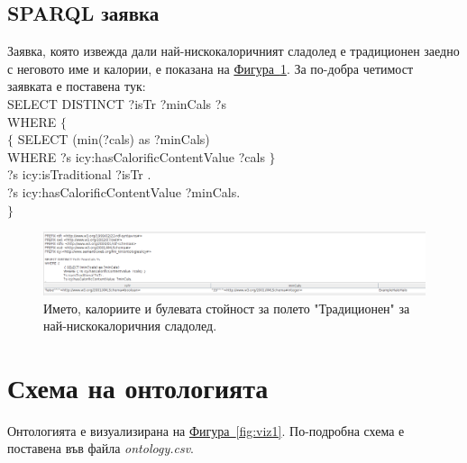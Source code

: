 \documentclass[12pt]{article}
\newcommand*{\MyIndent}{\hspace*{7em}}
\begin{document}
    \subsection{SPARQL заявка}

        Заявка, която извежда дали най-нискокалоричният сладолед е традиционен заедно с неговото име и калории, е показана на \hyperref[fig:sparql1]{Фигура~\ref*{fig:sparql1}}. За по-добра четимост заявката е поставена тук: \\

        SELECT DISTINCT ?isTr ?minCals ?s \\
        WHERE $\{$ \\
            \MyIndent $\{$ SELECT (min(?cals) as ?minCals) \\
        	\MyIndent WHERE { ?s icy:hasCalorificContentValue  ?cals} $\}$ \\
        	\MyIndent ?s icy:isTraditional ?isTr . \\
        	\MyIndent ?s icy:hasCalorificContentValue  ?minCals. \\
        $\}$
        
        \begin{figure}
        \centering
            \includegraphics[scale=0.3]{./images/sparql1.png}
            \caption{Името, калориите и булевата стойност за полето "Традиционен" за най-нискокалоричния сладолед.}
            \label{fig:sparql1}
        \end{figure}
        

\section{Схема на онтологията}

Онтологията е визуализирана на \hyperref[fig:viz1]{Фигура~\ref*{fig:viz1}}. По-подробна схема е поставена във файла \textit{ontology.csv}.
\end{document}

